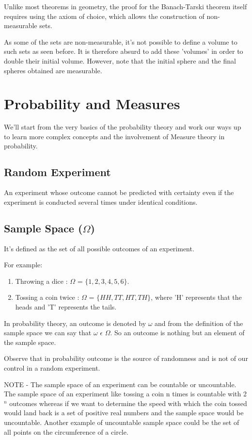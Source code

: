 \documentclass{article}
\begin{document}
Unlike most theorems in geometry, the proof for the Banach-Tarski theorem itself requires using the axiom of choice, which allows the construction of non-measurable sets.\medskip

As some of the sets are non-measurable, it's not possible to define a volume to such sets as seen before. It is therefore absurd to add these 'volumes' in order to double their initial volume. However, note that the initial sphere and the final spheres obtained are measurable.

\section{Probability and Measures}


We'll start from the very basics of the probability theory and work our ways up to learn more complex concepts and the involvement of Measure theory in probability.

\subsection{Random Experiment}

An experiment whose outcome cannot be predicted with certainty even if the experiment is conducted several times under identical conditions.

\subsection{Sample Space ($\Omega$)}
    
It's defined as the set of all possible outcomes of an experiment.

For example:
\begin{enumerate}
    \item Throwing a dice : $\Omega$ = $\{1,2,3,4,5,6\}.$
    \item  Tossing a coin twice : $\Omega$ = $\{HH, TT, HT, TH\}$, where 'H' represents that the heads and 'T' represents the tails.
\end{enumerate}


In probability theory, an outcome is denoted by $\omega$ and from the definition of the sample space we can say that $\omega$ $\epsilon$ $\Omega$.
So an outcome is nothing but an element of the sample space.

Observe that in probability outcome is the source of randomness and is not of our control in a random experiment.
\bigskip

NOTE - The sample space of an experiment can be countable or uncountable. The sample space of an experiment like tossing a coin n times is countable with 2$^{n}$ outcomes whereas if we want to determine the speed with which the coin tossed would land back is a set of positive real numbers and the sample space would be uncountable. Another example of uncountable sample space could be the set of all points on the circumference of a circle.\bigskip
\end{document}
